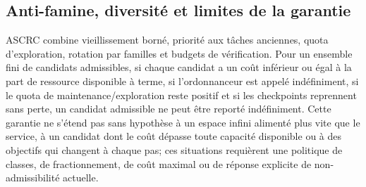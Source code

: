 \subsection{Anti-famine, diversité et limites de la garantie}
ASCRC combine vieillissement borné, priorité aux tâches anciennes, quota d'exploration, rotation par familles et budgets de vérification. Pour un ensemble fini de candidats admissibles, si chaque candidat a un coût inférieur ou égal à la part de ressource disponible à terme, si l'ordonnanceur est appelé indéfiniment, si le quota de maintenance/exploration reste positif et si les checkpoints reprennent sans perte, un candidat admissible ne peut être reporté indéfiniment. Cette garantie ne s'étend pas sans hypothèse à un espace infini alimenté plus vite que le service, à un candidat dont le coût dépasse toute capacité disponible ou à des objectifs qui changent à chaque pas; ces situations requièrent une politique de classes, de fractionnement, de coût maximal ou de réponse explicite de non-admissibilité actuelle.

